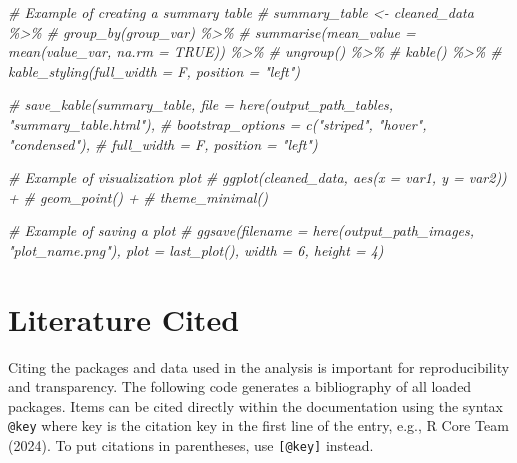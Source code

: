 \documentclass[
]{article}
\newenvironment{Shaded}{\begin{snugshade}}{\end{snugshade}}
\newcommand{\CommentTok}[1]{\textcolor[rgb]{0.56,0.35,0.01}{\textit{#1}}}
\begin{document}
\begin{Shaded}
\begin{Highlighting}[]
\CommentTok{\# Example of creating a summary table }
\CommentTok{\# summary\_table \textless{}{-} cleaned\_data \%\textgreater{}\%}
\CommentTok{\#   group\_by(group\_var) \%\textgreater{}\%}
\CommentTok{\#   summarise(mean\_value = mean(value\_var, na.rm = TRUE)) \%\textgreater{}\%}
\CommentTok{\#   ungroup() \%\textgreater{}\%}
\CommentTok{\#   kable() \%\textgreater{}\%}
\CommentTok{\#   kable\_styling(full\_width = F, position = "left") }

\CommentTok{\# save\_kable(summary\_table, file = here(output\_path\_tables, "summary\_table.html"),}
\CommentTok{\#   bootstrap\_options = c("striped", "hover", "condensed"),}
\CommentTok{\#   full\_width = F, position = "left")}
\end{Highlighting}
\end{Shaded}

\begin{Shaded}
\begin{Highlighting}[]
\CommentTok{\# Example of visualization plot}
\CommentTok{\# ggplot(cleaned\_data, aes(x = var1, y = var2)) +}
\CommentTok{\#   geom\_point() +}
\CommentTok{\#   theme\_minimal()}

\CommentTok{\# Example of saving a plot}
\CommentTok{\# ggsave(filename = here(output\_path\_images, "plot\_name.png"), plot = last\_plot(), width = 6, height = 4)}
\end{Highlighting}
\end{Shaded}

\section{Literature Cited}\label{literature-cited}

Citing the packages and data used in the analysis is important for
reproducibility and transparency. The following code generates a
bibliography of all loaded packages. Items can be cited directly within
the documentation using the syntax \texttt{@key} where key is the
citation key in the first line of the entry, e.g., R Core Team (2024).
To put citations in parentheses, use \texttt{{[}@key{]}} instead.
\end{document}
